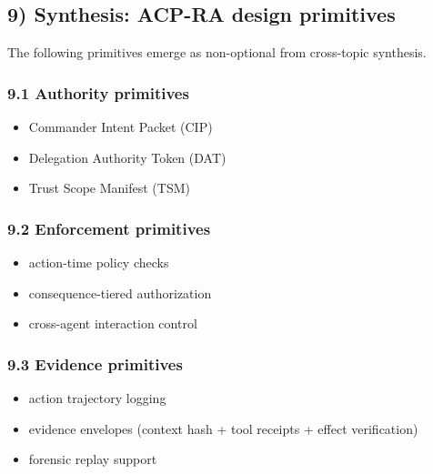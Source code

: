 \documentclass[11pt]{article}
\begin{document}
\hypertarget{synthesis-acp-ra-design-primitives}{%
\subsection{9) Synthesis: ACP-RA design
primitives}\label{synthesis-acp-ra-design-primitives}}

The following primitives emerge as non-optional from cross-topic
synthesis.

\hypertarget{authority-primitives}{%
\subsubsection{9.1 Authority primitives}\label{authority-primitives}}

\begin{itemize}
\tightlist
\item
  Commander Intent Packet (CIP)
\item
  Delegation Authority Token (DAT)
\item
  Trust Scope Manifest (TSM)
\end{itemize}

\hypertarget{enforcement-primitives}{%
\subsubsection{9.2 Enforcement
primitives}\label{enforcement-primitives}}

\begin{itemize}
\tightlist
\item
  action-time policy checks
\item
  consequence-tiered authorization
\item
  cross-agent interaction control
\end{itemize}

\hypertarget{evidence-primitives}{%
\subsubsection{9.3 Evidence primitives}\label{evidence-primitives}}

\begin{itemize}
\tightlist
\item
  action trajectory logging
\item
  evidence envelopes (context hash + tool receipts + effect
  verification)
\item
  forensic replay support
\end{itemize}
\end{document}

